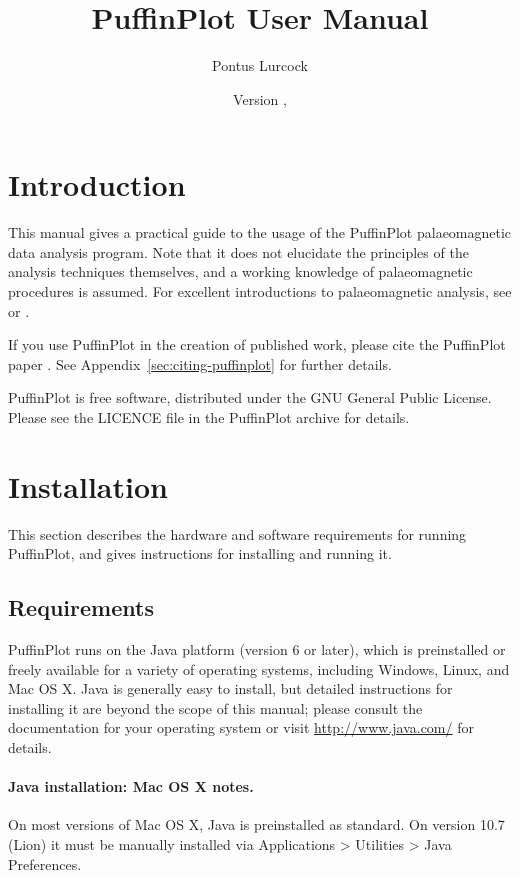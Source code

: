 \documentclass[a4paper,british]{article}
\title{PuffinPlot User Manual}
\author{Pontus Lurcock}
\date{Version \HgVersion, \HgDate}
\newcommand{\ppcmd}[1]{\textsf{#1}} %
\newcommand{\submenu}{ \textgreater{} } %
\begin{document}
\maketitle

\tableofcontents

\newpage

\section{Introduction}

This manual gives a practical guide to the usage of the PuffinPlot
palaeomagnetic data analysis program. Note that it does not elucidate the
principles of the analysis techniques themselves, and a working knowledge of
palaeomagnetic procedures is assumed. For excellent introductions to
palaeomagnetic analysis, see \cite{tauxe2010paleomagnetism} or
\cite{butler1992paleomagnetism}.

If you use PuffinPlot in the creation of published work, please cite the
PuffinPlot paper \citep{lurcock2012puffinplot}. See
Appendix~\ref{sec:citing-puffinplot} for further details.

PuffinPlot is free software, distributed under the GNU General Public
License. Please see the \ppcmd{LICENCE} file in the PuffinPlot archive
for details.

\section{Installation}

This section describes the hardware and software requirements for
running PuffinPlot, and gives instructions for installing and running
it.

\subsection{Requirements}

PuffinPlot runs on the Java platform (version 6 or later), which is
preinstalled or freely available for a variety of operating systems,
including Windows, Linux, and Mac OS X. Java is generally easy to install,
but detailed instructions for installing it are beyond the scope of this
manual; please consult the documentation for your operating system or visit
\url{http://www.java.com/} for details.

\paragraph{Java installation: Mac OS X notes.} On most versions of Mac OS X,
Java is preinstalled as standard. On version 10.7 (Lion) it must be manually
installed via \ppcmd{Applications\submenu Utilities\submenu Java
  Preferences}.
\end{document}
